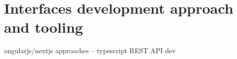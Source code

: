 \section{Interfaces development approach and tooling}
\label{sec:interfaces_dev}

angularjs/nextjs approaches -- typescript
REST API dev